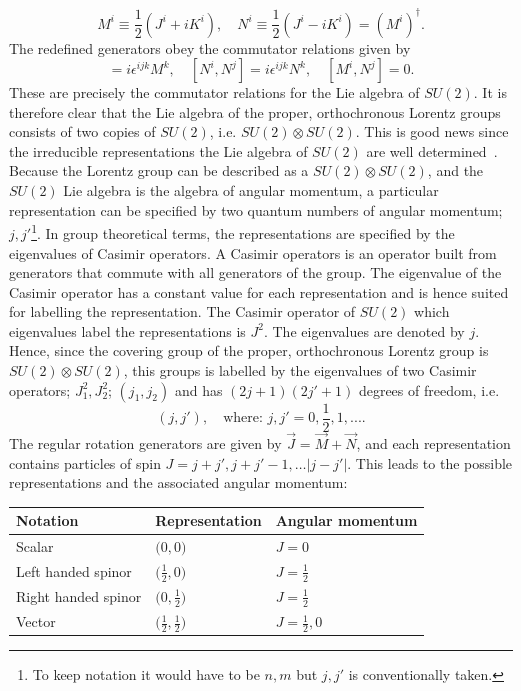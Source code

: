 \begin{equation}
	M^i\equiv \frac{1}{2}(J^i+iK^i), \quad N^i\equiv \frac{1}{2}(J^i-iK^i)=(M^i)^\dagger.
\end{equation} 
The redefined generators obey the commutator relations given by
\begin{equation}
	[M^i,M^j]=i\epsilon^{ijk}M^{k}, \quad [N^i,N^j]=i\epsilon^{ijk}N^{k}, \quad [M^i,N^j]=0.
	\label{gen}
\end{equation} 
These are precisely the commutator relations for the Lie algebra of $SU(2)$. It is therefore clear that the Lie algebra of the proper, orthochronous Lorentz groups consists of two copies of $SU(2)$, i.e. $SU(2)\otimes SU(2)$. This is good news since the irreducible representations the Lie algebra of $SU(2)$ are well determined~\citep{Schwichtenberg2015}. Because the Lorentz group can be described as a $SU(2)\otimes SU(2)$, and the $SU(2)$ Lie algebra is the algebra of angular momentum, a particular representation can be specified by two quantum numbers of angular momentum; $j,j'$\footnote{To keep notation it would have to be $n,m$ but $j,j'$ is conventionally taken.}. In group theoretical terms, the representations are specified by the eigenvalues of Casimir operators. A Casimir operators is an operator built from generators that commute with all generators of the group. The eigenvalue of the Casimir operator has a constant value for each representation and is hence suited for labelling the representation. The Casimir operator of $SU(2)$ which eigenvalues label the representations is $J^2$. The eigenvalues are denoted by $j$. Hence, since the covering group of the proper, orthochronous Lorentz group is $SU(2)\otimes SU(2)$, this groups is labelled by the eigenvalues of two Casimir operators; $J_1^2, J_2^2$; $(j_1,j_2)$ and has $(2j+1)(2j'+1)$ degrees of freedom,  i.e.
\begin{equation}
	(j,j'), \quad \text{where: } j,j'=0,\frac{1}{2},1,....
\end{equation} 
The regular rotation generators are given by $\vec{J}=\vec{M}+\vec{N}$, and each representation contains particles of spin $J=j+j', j+j'-1,\dots |j-j'|$. This leads to the possible representations and the associated angular momentum:\newline
\begin{center}
	\begin{tabular}{ |l|l|l| }
		\hline
		Notation & Representation & Angular momentum \\ \hline
		Scalar & $\big(0,0\big)$ & $J=0$ \\
		Left handed spinor & $\big(\frac{1}{2},0\big)$ & $J=\frac{1}{2}$ \\
		Right handed spinor & $\big(0,\frac{1}{2}\big)$ & $J=\frac{1}{2}$ \\
		Vector & $\big(\frac{1}{2},\frac{1}{2}\big)$ & $J=\frac{1}{2},0$ \\
		\hline
	\end{tabular}
\end{center}
